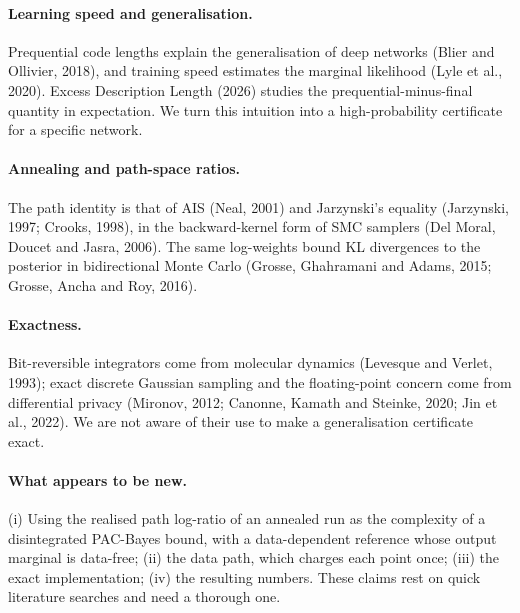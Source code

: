 \documentclass[11pt]{article}
\theoremstyle{definition}
\theoremstyle{remark}
\begin{document}
\paragraph{Learning speed and generalisation.} Prequential code lengths explain the generalisation of deep networks
(Blier and Ollivier, 2018), and training speed estimates the marginal likelihood (Lyle et al., 2020). Excess Description
Length (2026) studies the prequential-minus-final quantity in expectation. We turn this intuition into a
high-probability certificate for a specific network.
\paragraph{Annealing and path-space ratios.} The path identity is that of AIS (Neal, 2001) and Jarzynski's equality
(Jarzynski, 1997; Crooks, 1998), in the backward-kernel form of SMC samplers (Del Moral, Doucet and Jasra, 2006). The same
log-weights bound KL divergences to the posterior in bidirectional Monte Carlo (Grosse, Ghahramani and Adams, 2015;
Grosse, Ancha and Roy, 2016).
\paragraph{Exactness.} Bit-reversible integrators come from molecular dynamics (Levesque and Verlet, 1993); exact discrete
Gaussian sampling and the floating-point concern come from differential privacy (Mironov, 2012; Canonne, Kamath and
Steinke, 2020; Jin et al., 2022). We are not aware of their use to make a generalisation certificate exact.
\paragraph{What appears to be new.} (i) Using the realised path log-ratio of an annealed run as the complexity of a
disintegrated PAC-Bayes bound, with a data-dependent reference whose output marginal is data-free; (ii) the data path,
which charges each point once; (iii) the exact implementation; (iv) the resulting numbers. These claims rest on quick
literature searches and need a thorough one.

\end{document}

